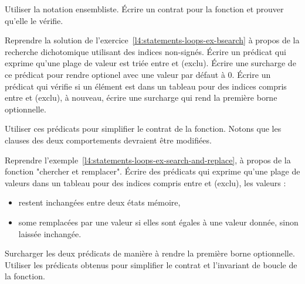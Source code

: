Utiliser la notation ensembliste. Écrire un contrat pour la fonction et prouver
qu'elle le vérifie.



\label{l4:acsl-properties-predicates-ex-bsearch}


Reprendre la solution de l'exercice~\ref{l4:statements-loops-ex-bsearch} à propos
de la recherche dichotomique utilisant des indices non-signés. Écrire un prédicat
qui exprime qu'une plage de valeur est triée entre  et
 (exclu). Écrire une surcharge de ce prédicat pour rendre
 optionel avec une valeur par défaut à $0$. Écrire un prédicat
qui vérifie si un élément est dans un tableau pour des indices compris entre
 et  (exclu), à nouveau, écrire une surcharge
qui rend la première borne optionnelle.


Utiliser ces prédicats pour simplifier le contrat de la fonction. Notons que les
clauses  des deux comportements devraient être modifiées.





Reprendre l'exemple~\ref{l4:statements-loops-ex-search-and-replace}, à propos de
la fonction "chercher et remplacer". Écrire des prédicats qui exprime qu'une plage
de valeurs dans un tableau pour des indices compris entre  et
 (exclu), les valeurs :

\begin{itemize}
  \item restent inchangées entre deux états mémoire,
  \item some remplacées par une valeur si elles sont égales à une valeur donnée,
        sinon laissée inchangée.
\end{itemize}


Surcharger les deux prédicats de manière à rendre la première borne optionnelle.
Utiliser les prédicats obtenus pour simplifier le contrat et l'invariant de
boucle de la fonction.
